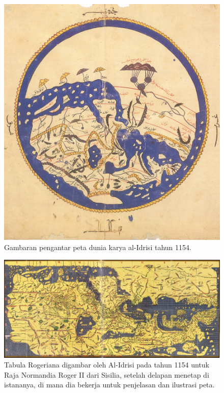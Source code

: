 \begin{figure}[ht]

\centerline{\includegraphics[width=1\textwidth]{figures/petaduniaalid.JPG}}
\caption{Gambaran pengantar peta dunia karya al-Idrisi tahun 1154.}
\end{figure}

\begin{figure}[ht]
	\centerline{\includegraphics[width=1\textwidth]{figures/TabulaRogeriana.jpg}}
\vskip2pt
\caption{Tabula Rogeriana digambar oleh Al-Idrisi pada tahun 1154 untuk Raja Normandia Roger II dari Sisilia, setelah delapan menetap di istananya, di mana dia bekerja untuk penjelasan dan ilustrasi peta.}
\end{figure}

